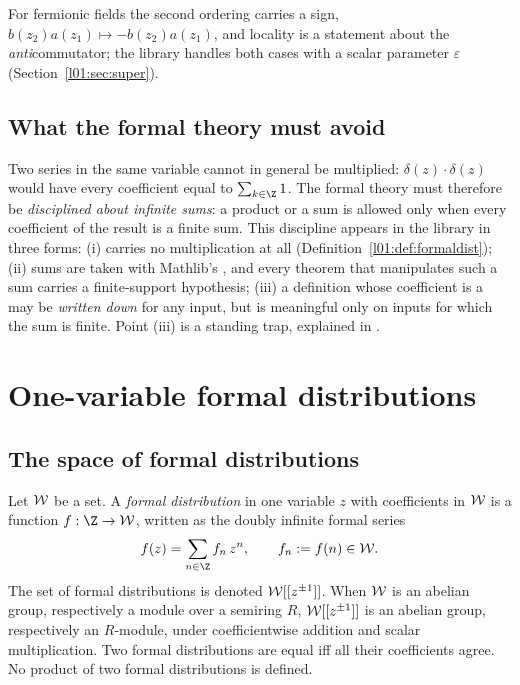For fermionic fields the second ordering carries a sign, $b(z_2)a(z_1)\mapsto -b(z_2)a(z_1)$, and
locality is a statement about the \emph{anti}commutator; the library handles both cases with a
scalar parameter $\varepsilon$ (Section~\ref{l01:sec:super}).

\subsection{What the formal theory must avoid}

Two series in the same variable cannot in general be multiplied: $\delta(z)\cdot\delta(z)$ would
have every coefficient equal to $\sum_{k\in\Z}1$. The formal theory must therefore be
\emph{disciplined about infinite sums}: a product or a sum is allowed only when every coefficient
of the result is a finite sum. This discipline appears in the library in three forms:
(i)  carries no multiplication at all (Definition~\ref{l01:def:formaldist});
(ii) sums are taken with Mathlib's , and every theorem that manipulates such a sum
carries a finite-support hypothesis; (iii) a definition whose coefficient is a  may be
\emph{written down} for any input, but is meaningful only on inputs for which the sum is finite.
Point (iii) is a standing trap, explained in .

\section{One-variable formal distributions}\label{l01:sec:onevar}

\subsection{The space of formal distributions}

\begin{definition}\label{l01:def:formaldist}
Let $\mathcal{W}$ be a set. A \emph{formal distribution} in one variable $z$ with coefficients in
$\mathcal{W}$ is a function $f:\Z\to\loneW$, written as the doubly infinite formal series
\begin{equation*}
  f(z) = \sum_{n\in\Z} f_n\,z^n,\qquad f_n := f(n)\in\loneW .
\end{equation*}
The set of formal distributions is denoted $\mathcal{W}[[z^{\pm1}]]$. When $\mathcal{W}$ is an abelian group,
respectively a module over a semiring $R$, $\mathcal{W}[[z^{\pm1}]]$ is an abelian group, respectively an
$R$-module, under coefficientwise addition and scalar multiplication. Two formal distributions are
equal iff all their coefficients agree. No product of two formal distributions is defined.
\end{definition}

